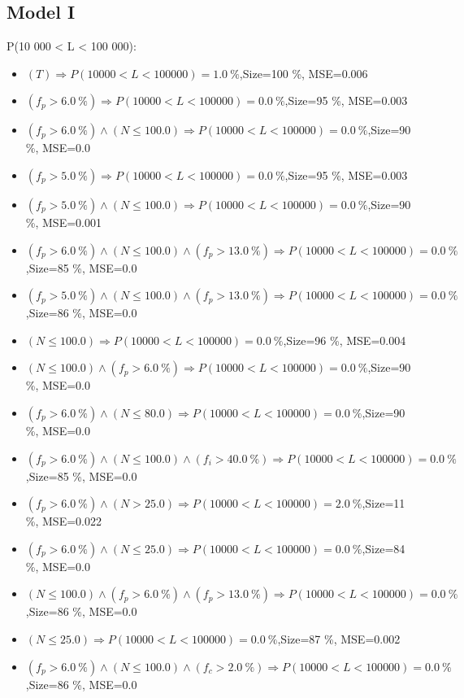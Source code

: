 \documentclass[numbered]{CSL}
\begin{document}
\subsection{Model I}
P(10 000 < L < 100 000):
\begin{itemize}
\item $(T) \Rightarrow P(10 000 < L < 100 000) = 1.0~\%$,\hfill Size=100 \%, MSE=0.006
\item $(f_p > 6.0~\%) \Rightarrow P(10 000 < L < 100 000) = 0.0~\%$,\hfill Size=95 \%, MSE=0.003
\item $(f_p > 6.0~\%) \land (N \leq 100.0) \Rightarrow P(10 000 < L < 100 000) = 0.0~\%$,\hfill Size=90 \%, MSE=0.0
\item $(f_p > 5.0~\%) \Rightarrow P(10 000 < L < 100 000) = 0.0~\%$,\hfill Size=95 \%, MSE=0.003
\item $(f_p > 5.0~\%) \land (N \leq 100.0) \Rightarrow P(10 000 < L < 100 000) = 0.0~\%$,\hfill Size=90 \%, MSE=0.001
\item $(f_p > 6.0~\%) \land (N \leq 100.0) \land (f_p > 13.0~\%) \Rightarrow P(10 000 < L < 100 000) = 0.0~\%$,\hfill Size=85 \%, MSE=0.0
\item $(f_p > 5.0~\%) \land (N \leq 100.0) \land (f_p > 13.0~\%) \Rightarrow P(10 000 < L < 100 000) = 0.0~\%$,\hfill Size=86 \%, MSE=0.0
\item $(N \leq 100.0) \Rightarrow P(10 000 < L < 100 000) = 0.0~\%$,\hfill Size=96 \%, MSE=0.004
\item $(N \leq 100.0) \land (f_p > 6.0~\%) \Rightarrow P(10 000 < L < 100 000) = 0.0~\%$,\hfill Size=90 \%, MSE=0.0
\item $(f_p > 6.0~\%) \land (N \leq 80.0) \Rightarrow P(10 000 < L < 100 000) = 0.0~\%$,\hfill Size=90 \%, MSE=0.0
\item $(f_p > 6.0~\%) \land (N \leq 100.0) \land (f_i > 40.0~\%) \Rightarrow P(10 000 < L < 100 000) = 0.0~\%$,\hfill Size=85 \%, MSE=0.0
\item $(f_p > 6.0~\%) \land (N > 25.0) \Rightarrow P(10 000 < L < 100 000) = 2.0~\%$,\hfill Size=11 \%, MSE=0.022
\item $(f_p > 6.0~\%) \land (N \leq 25.0) \Rightarrow P(10 000 < L < 100 000) = 0.0~\%$,\hfill Size=84 \%, MSE=0.0
\item $(N \leq 100.0) \land (f_p > 6.0~\%) \land (f_p > 13.0~\%) \Rightarrow P(10 000 < L < 100 000) = 0.0~\%$,\hfill Size=86 \%, MSE=0.0
\item $(N \leq 25.0) \Rightarrow P(10 000 < L < 100 000) = 0.0~\%$,\hfill Size=87 \%, MSE=0.002
\item $(f_p > 6.0~\%) \land (N \leq 100.0) \land (f_c > 2.0~\%) \Rightarrow P(10 000 < L < 100 000) = 0.0~\%$,\hfill Size=86 \%, MSE=0.0

\end{itemize}
\end{document}
